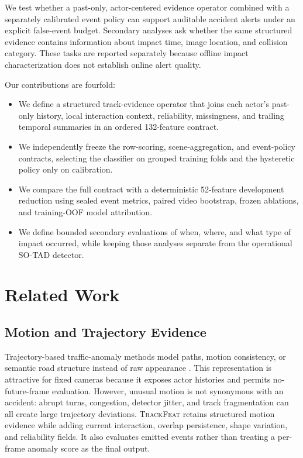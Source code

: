 \documentclass[letterpaper]{article}
\newcommand{\method}{\textsc{TrackFeat}}
\begin{document}
We test whether a past-only, actor-centered evidence operator combined with a separately calibrated event policy can support auditable accident alerts under an explicit false-event budget. Secondary analyses ask whether the same structured evidence contains information about impact time, image location, and collision category. These tasks are reported separately because offline impact characterization does not establish online alert quality.

Our contributions are fourfold:
\begin{itemize}
    \item We define a structured track-evidence operator that joins each actor’s past-only history, local interaction context, reliability, missingness, and trailing temporal summaries in an ordered 132-feature contract.
    \item We independently freeze the row-scoring, scene-aggregation, and event-policy contracts, selecting the classifier on grouped training folds and the hysteretic policy only on calibration.
    \item We compare the full contract with a deterministic 52-feature development reduction using sealed event metrics, paired video bootstrap, frozen ablations, and training-OOF model attribution.
    \item We define bounded secondary evaluations of when, where, and what type of impact occurred, while keeping those analyses separate from the operational SO-TAD detector.
\end{itemize}

\clearpage
\section{Related Work}
\subsection{Motion and Trajectory Evidence}
Trajectory-based traffic-anomaly methods model paths, motion consistency, or semantic road structure instead of raw appearance \cite{zhao2019trajectory,damicantonio2024utrand}. This representation is attractive for fixed cameras because it exposes actor histories and permits no-future-frame evaluation. However, unusual motion is not synonymous with an accident: abrupt turns, congestion, detector jitter, and track fragmentation can all create large trajectory deviations. \method{} retains structured motion evidence while adding current interaction, overlap persistence, shape variation, and reliability fields. It also evaluates emitted events rather than treating a per-frame anomaly score as the final output.
\end{document}
